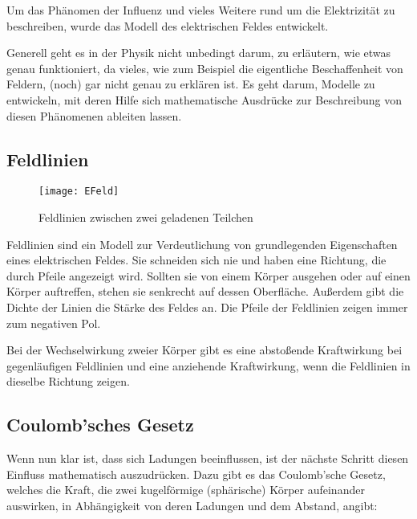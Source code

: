 Um das Phänomen der Influenz und vieles Weitere rund um die Elektrizität zu beschreiben, wurde das Modell des elektrischen Feldes entwickelt. 

\begin{NiceToKnow}
Generell geht es in der Physik nicht unbedingt darum, zu erläutern, wie etwas genau funktioniert, da vieles, wie zum Beispiel die eigentliche Beschaffenheit von Feldern, (noch) gar nicht genau zu erklären ist. Es geht darum, Modelle zu entwickeln, mit deren Hilfe sich mathematische Ausdrücke zur Beschreibung von diesen Phänomenen ableiten lassen.
\end{NiceToKnow}


\subsection{Feldlinien}

\begin{figure}[h!]
	\centering
	\texttt{[image: EFeld]}
	\caption{Feldlinien zwischen zwei geladenen Teilchen}
\end{figure}

Feldlinien sind ein Modell zur Verdeutlichung von grundlegenden Eigenschaften eines elektrischen Feldes. Sie schneiden sich nie und haben eine Richtung, die durch Pfeile angezeigt wird. Sollten sie von einem Körper ausgehen oder auf einen Körper auftreffen, stehen sie senkrecht auf dessen Oberfläche. Außerdem gibt die Dichte der Linien die Stärke des Feldes an. Die Pfeile der Feldlinien zeigen immer zum negativen Pol.

Bei der Wechselwirkung zweier Körper gibt es eine abstoßende Kraftwirkung bei gegenläufigen Feldlinien und eine anziehende Kraftwirkung, wenn die Feldlinien in dieselbe Richtung zeigen.


\subsection{Coulomb'sches Gesetz} \label{subsec:CoulombGesetz}

Wenn nun klar ist, dass sich Ladungen beeinflussen, ist der nächste Schritt diesen \glqq Einfluss\grqq{} mathematisch auszudrücken. Dazu gibt es das Coulomb'sche Gesetz, welches die Kraft, die zwei kugelförmige (sphärische) Körper aufeinander auswirken, in Abhängigkeit von deren Ladungen und dem Abstand, angibt:

